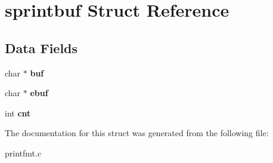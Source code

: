 \hypertarget{structsprintbuf}{}\section{sprintbuf Struct Reference}
\label{structsprintbuf}
\subsection*{Data Fields}
\begin{DoxyCompactItemize}
\item 
char $\ast$ {\bfseries buf}\hypertarget{structsprintbuf_a73c3ae0ec99def51340175cb60059e27}{}\label{structsprintbuf_a73c3ae0ec99def51340175cb60059e27}

\item 
char $\ast$ {\bfseries ebuf}\hypertarget{structsprintbuf_a792c357caab86cb2bdf2e6e8f1831bcc}{}\label{structsprintbuf_a792c357caab86cb2bdf2e6e8f1831bcc}

\item 
int {\bfseries cnt}\hypertarget{structsprintbuf_ae554d82663f5939b5fd5369d80a4910c}{}\label{structsprintbuf_ae554d82663f5939b5fd5369d80a4910c}

\end{DoxyCompactItemize}


The documentation for this struct was generated from the following file\+:\begin{DoxyCompactItemize}
\item 
printfmt.\+c\end{DoxyCompactItemize}
